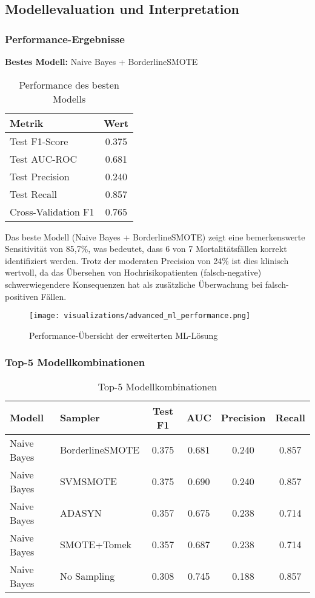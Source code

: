 \documentclass[12pt]{article}
\begin{document}
\subsection{Modellevaluation und Interpretation}

\subsubsection{Performance-Ergebnisse}
\textbf{Bestes Modell:} Naive Bayes + BorderlineSMOTE

\begin{table}[H]
\centering
\begin{tabular}{lc}
\toprule
\textbf{Metrik} & \textbf{Wert} \\
\midrule
Test F1-Score & 0.375 \\
Test AUC-ROC & 0.681 \\
Test Precision & 0.240 \\
Test Recall & 0.857 \\
Cross-Validation F1 & 0.765 \\
\bottomrule
\end{tabular}
\caption{Performance des besten Modells}
\end{table}

Das beste Modell (Naive Bayes + BorderlineSMOTE) zeigt eine bemerkenswerte Sensitivität von 85,7\%, was bedeutet, dass 6 von 7 Mortalitätsfällen korrekt identifiziert werden. Trotz der moderaten Precision von 24\% ist dies klinisch wertvoll, da das Übersehen von Hochrisikopatienten (falsch-negative) schwerwiegendere Konsequenzen hat als zusätzliche Überwachung bei falsch-positiven Fällen.

\begin{figure}[H]
\centering
\texttt{[image: visualizations/advanced\_ml\_performance.png]}
\caption{Performance-Übersicht der erweiterten ML-Lösung}
\label{fig:ml_performance}
\end{figure}

\subsubsection{Top-5 Modellkombinationen}
\begin{table}[H]
\centering
\small
\begin{tabular}{llcccc}
\toprule
\textbf{Modell} & \textbf{Sampler} & \textbf{Test F1} & \textbf{AUC} & \textbf{Precision} & \textbf{Recall} \\
\midrule
Naive Bayes & BorderlineSMOTE & 0.375 & 0.681 & 0.240 & 0.857 \\
Naive Bayes & SVMSMOTE & 0.375 & 0.690 & 0.240 & 0.857 \\
Naive Bayes & ADASYN & 0.357 & 0.675 & 0.238 & 0.714 \\
Naive Bayes & SMOTE+Tomek & 0.357 & 0.687 & 0.238 & 0.714 \\
Naive Bayes & No Sampling & 0.308 & 0.745 & 0.188 & 0.857 \\
\bottomrule
\end{tabular}
\caption{Top-5 Modellkombinationen}
\end{table}
\end{document}
